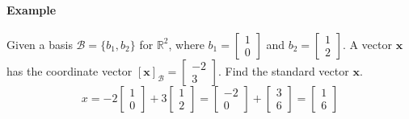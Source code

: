 \documentclass[../linear-algebra.tex]{subfiles}
\begin{document}
\paragraph{Example} Given a basis $\mathcal{B} = \{b_1, b_2\}$ for $\mathbb{R}^2$, where $b_1 = \begin{bmatrix} 1 \\ 0 \end{bmatrix}$ and $b_2 = \begin{bmatrix} 1 \\ 2 \end{bmatrix}$.\newline
A vector $\mathbf{x}$ has the coordinate vector $[\mathbf{x}]_{\mathcal{B}} = \begin{bmatrix} -2 \\ 3 \end{bmatrix}$. Find the standard vector $\mathbf{x}$.
$$x = -2\begin{bmatrix} 1 \\ 0 \end{bmatrix} + 3\begin{bmatrix} 1 \\ 2 \end{bmatrix} = \begin{bmatrix} -2 \\ 0 \end{bmatrix} + \begin{bmatrix} 3 \\ 6 \end{bmatrix} = \begin{bmatrix} 1 \\ 6 \end{bmatrix}$$
\end{document}
